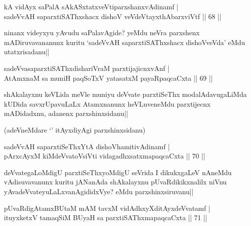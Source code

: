 \begin{shl}
kA vidAyx saPalA sAkASxtatxveVtiparxshanxvAdinamf |\\
sadeVvAH saparxtiSAThxshacx dishoV veVdeVtayxthAbarxviVtf \hfill || 68 ||
\end{shl}

\begin{artha}
ninanx videyxyu yAvudu saPalavAgide? yeMdu neVra parxshenx mADiruvavananunx kuritu `sadeVvAH saparxtiSAThxshacx dishoVveVda' eMdu utatxrisadanu||
\end{artha}


\begin{shl}
sadeVvasaparxtiSAThxdishariVraM parxtijajicnxvAnf |\\
AtAmxnaM sa muniH paqSoTxV yatasatxM payaRpaqcaCxta \hfill || 69 ||
\end{shl}

\begin{artha}
shAkalayxnu keVLida meVle muniyu deVvate parxtiSeThx modalAdavugaLiMda kUDida savxrUpavuLaLx Atamxnanunx heVLuveneMdu parxtijecnx mADidadxnu, adanenx parxshinxsidanu||

(adeVneMdare `\stext ' itAyxdiyAgi parxshinxsidanu)
\end{artha}


\begin{shl}
sadeVvAH saparxtiSeThxYtA dishoV\s hamitivAdinamf |\\
pArxcAyxM kiMdeVvatoV\s siVti vidagadhxsatxmapaqcaCxta \hfill || 70 ||
\end{shl}

\begin{artha}
deVvategaLoMdigU parxtiSeThxyoMdigU seVrida I dikukxgaLeV nAneMdu vAdisuvavanunx kuritu jANanAda shAkalayxnu pUvaRdikikxnalilx niVnu yAvadeVvateyuLaLxvanAgididxVye? eMdu parxshinxsiruvanu||
\end{artha}


\begin{shl}
pUvaRdigAtamxBUtaM mAM tavxM vidAdhxyXditAyxdeVvatamf |\\
ituyxketxV tamaqSiM BUyaH sa parxtiSAThxmapaqcaCxta \hfill || 71 ||
\end{shl}


